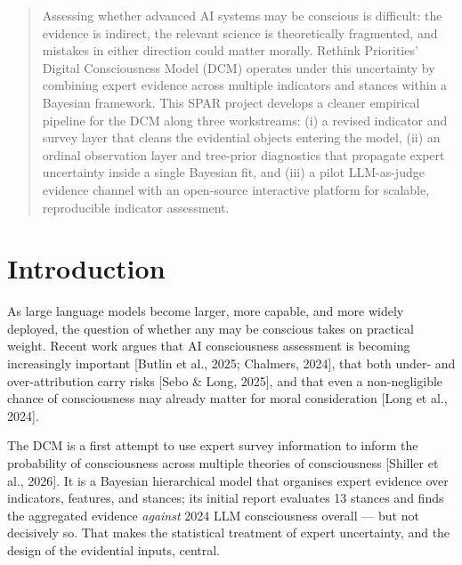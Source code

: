 \documentclass[a0,portrait]{a0poster}
\begin{document}
\begin{multicols}{3}


\color{PosterDark}
\begin{abstract}
\noindent Assessing whether advanced AI systems may be conscious is difficult: the evidence is indirect, the relevant science is theoretically fragmented, and mistakes in either direction could matter morally. Rethink Priorities' Digital Consciousness Model (DCM) operates under this uncertainty by combining expert evidence across multiple indicators and stances within a Bayesian framework. This SPAR project develops a cleaner empirical pipeline for the DCM along three workstreams: (i) a revised indicator and survey layer that cleans the evidential objects entering the model, (ii) an ordinal observation layer and tree-prior diagnostics that propagate expert uncertainty inside a single Bayesian fit, and (iii) a pilot LLM-as-judge evidence channel with an open-source interactive platform for scalable, reproducible indicator assessment.
\end{abstract}


\color{Black}
\section*{\color{PosterGreen} Introduction}

As large language models become larger, more capable, and more widely deployed, the question of whether any may be conscious takes on practical weight. Recent work argues that AI consciousness assessment is becoming increasingly important [Butlin et al., 2025; Chalmers, 2024], that both under- and over-attribution carry risks [Sebo \& Long, 2025], and that even a non-negligible chance of consciousness may already matter for moral consideration [Long et al., 2024].

The DCM is a first attempt to use expert survey information to inform the probability of consciousness across multiple theories of consciousness [Shiller et al., 2026]. It is a Bayesian hierarchical model that organises expert evidence over indicators, features, and stances; its initial report evaluates 13 stances and finds the aggregated evidence \textit{against} 2024 LLM consciousness overall --- but not decisively so. That makes the statistical treatment of expert uncertainty, and the design of the evidential inputs, central.


\end{multicols}
\end{document}
